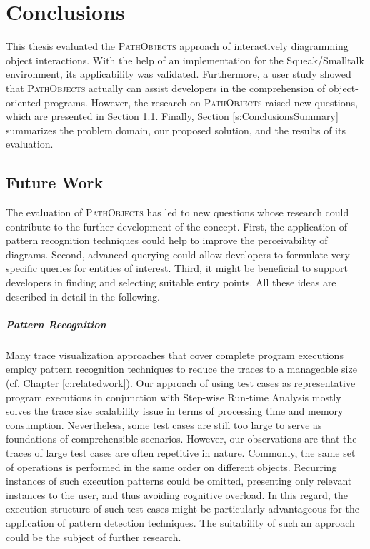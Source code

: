 \chapter{Conclusions}
\label{c:conclusions}
This thesis evaluated the \textsc{PathObjects} approach of interactively diagramming object interactions.
With the help of an implementation for the Squeak/Smalltalk environment, its applicability was validated.
Furthermore, a user study showed that \textsc{PathObjects} actually can assist developers in the comprehension of object-oriented programs.
However, the research on \textsc{PathObjects} raised new questions, which are presented in Section \ref{s:ConclusionsFuture}.
Finally, Section \ref{s:ConclusionsSummary} summarizes the problem domain, our proposed solution, and the results of its evaluation.

\section{Future Work}
\label{s:ConclusionsFuture}
The evaluation of \textsc{PathObjects} has led to new questions whose research could contribute to the further development of the concept.
First, the application of pattern recognition techniques could help to improve the perceivability of diagrams.
Second, advanced querying could allow developers to formulate very specific queries for entities of interest.
Third, it might be beneficial to support developers in finding and selecting suitable entry points.
All these ideas are described in detail in the following.

\paragraph{Pattern Recognition} Many trace visualization approaches that cover complete program executions employ pattern recognition techniques to reduce the traces to a manageable size (cf. Chapter \ref{c:relatedwork}).
Our approach of using test cases as representative program executions in conjunction with Step-wise Run-time Analysis mostly solves the trace size scalability issue in terms of processing time and memory consumption.
Nevertheless, some test cases are still too large to serve as foundations of comprehensible scenarios.
However, our observations are that the traces of large test cases are often repetitive in nature. Commonly, the same set of operations is performed in the same order on different objects.
Recurring instances of such execution patterns could be omitted, presenting only relevant instances to the user, and thus avoiding cognitive overload.
In this regard, the execution structure of such test cases might be particularly advantageous for the application of pattern detection techniques.
The suitability of such an approach could be the subject of further research.

